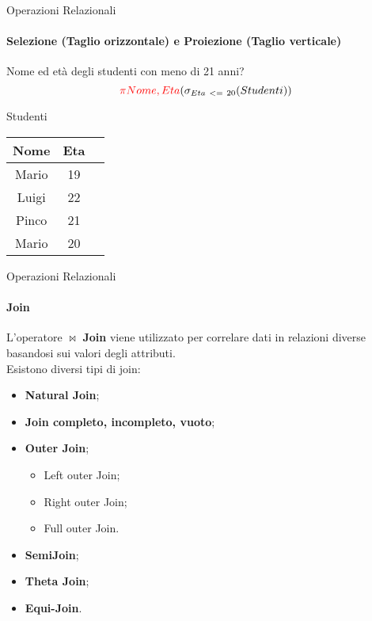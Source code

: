     \begin{frame}{Operazioni Relazionali}
        \framesubtitle{Selezione (Taglio orizzontale) e Proiezione (Taglio verticale)}
        Nome ed et\`a degli studenti con meno di 21 anni?
        \[{\color{red}{\pi Nome,Eta}}(\sigma_{Eta~<=~20} (Studenti))\]
                    \begin{center}
                        {\small Studenti}
                        
                        \begin{tabular}{|c|c|c|}
                            \hline
                            \rowcolor{cyan!30}Nome & Eta \\
                            \hline
                            \cellcolor{red}Mario &  \cellcolor{red}19 \\ \hline
                            Luigi & 22 \\ \hline
                            Pinco & 21 \\ \hline
                            \cellcolor{red}Mario & \cellcolor{red}20 \\ \hline
                            \end{tabular}
    
                    \end{center}
    \end{frame}
    \begin{frame}{Operazioni Relazionali}
        \framesubtitle{Join}
        L'operatore $\bowtie$ \textbf{Join} viene utilizzato per correlare dati in relazioni diverse basandosi sui valori degli attributi.
        \pause
        \\Esistono diversi tipi di join:
        \begin{itemize}
            \item \textbf{Natural Join};
            \item \textbf{Join completo, incompleto, vuoto};
            \item \textbf{Outer Join};
            \begin{itemize}
                \item Left outer Join;
                \item Right outer Join;
                \item Full outer Join.
            \end{itemize}
            \item \textbf{SemiJoin};
            \item \textbf{Theta Join};
            \item \textbf{Equi-Join}.
        \end{itemize}
    \end{frame}
